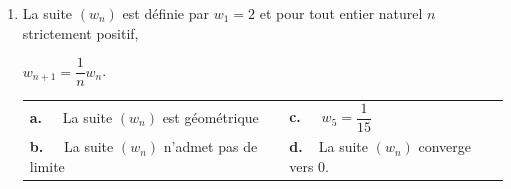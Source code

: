 \begin{enumerate}
\item  La suite $\left(w_n\right)$ est définie par $w_1 = 2$ et pour tout entier naturel $n$ strictement positif, 

$w_{n+1} = \dfrac1n w_n$.
\begin{center}
\begin{tabularx}{\linewidth}{*{2}X}
\textbf{a.~~} La suite $\left(w_n\right)$ est géométrique&\textbf{c.~~} $w_5 = \dfrac{1}{15}$\\
\textbf{b.~~} La suite $\left(w_n\right)$ n'admet pas de limite&\textbf{d.~~}La suite $\left(w_n\right)$ converge vers 0.
\end{tabularx}
\end{center}
\end{enumerate}

\bigskip
